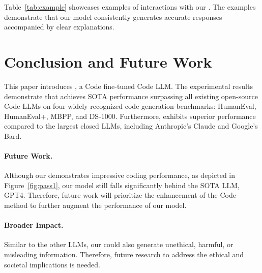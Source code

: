 Table~\ref{tab:example} showcases examples of interactions with our \modelname{}. The examples demonstrate that our model consistently generates accurate responses accompanied by clear explanations.\section{Conclusion and Future Work}

This paper introduces \modelname{}, a Code \name{} fine-tuned Code LLM. The experimental results demonstrate that \modelname{} achieves SOTA performance surpassing all existing open-source Code LLMs on four widely recognized code generation benchmarks: HumanEval, HumanEval+, MBPP, and DS-1000. Furthermore, \modelname{} exhibits superior performance compared to the largest closed LLMs, including Anthropic's Claude and Google's Bard.

\paragraph{Future Work.} Although our \modelname{} demonstrates impressive coding performance, as depicted in Figure~\ref{fig:pass1}, our model still falls significantly behind the SOTA LLM, GPT4. Therefore, future work will prioritize the enhancement of the Code \name{} method to further augment the performance of our model.

\paragraph{Broader Impact.} Similar to the other LLMs, our \modelname{} could also generate unethical, harmful, or misleading information. Therefore, future research to address the ethical and societal implications is needed.
\clearpage

{\small
}


